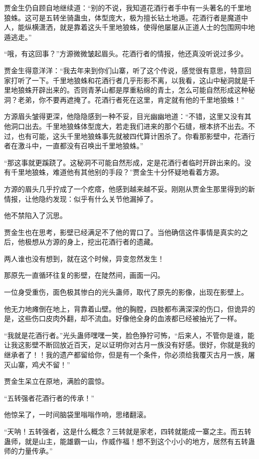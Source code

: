 \begin{this_body}
贾金生仍自顾自地继续道：“别的不说，我知道花酒行者手中有一头著名的千里地狼蛛。这可是五转坐骑蛊虫，体型庞大，极为擅长钻土地遁。花酒行者是魔道中人，能纵横潇洒，就是靠着这头千里地狼蛛，使得他屡屡从正道人士的包围网中地遁逃走。”

“哦，有这回事？”方源微微皱起眉头。花酒行者的情报，他还真没听说过多少。

贾金生得意洋洋：“我去年来到你们山寨，听了这个传说，感觉很有意思，特意回家打听了一下。千里地狼蛛和花酒行者几乎形影不离，以我看，这山中秘洞就是千里地狼蛛开辟出来的。否则青茅山都是厚重粘绵的青土，怎么可能自然形成这种秘洞？老弟，你不要再遮掩了。花酒行者死在这里，肯定就有他的千里地狼蛛！”

方源眉头皱得更深，他隐隐感到一种不妥，目光幽幽地道：“不错，这里又没有其他洞口出去。千里地狼蛛体型庞大，若走我们进来的那个石缝，根本挤不出去。不过，也有可能，这头千里地狼蛛事先就被四代算计困杀了。你看那影壁中，花酒行者在激斗中，一直都没有召唤出千里地狼蛛。”

“那这事就更蹊跷了。这秘洞不可能自然形成，定是花酒行者临时开辟出来的。没有千里地狼蛛，难道他有其他别的手段？”贾金生十分怀疑地看着方源。

方源的眉头几乎拧成了一个疙瘩，他感到越来越不妥。刚刚从贾金生那里得到的新情报，让他隐约发现：似乎有什么关节他漏掉了。

他不禁陷入了沉思。

贾金生也在思考，影壁已经满足不了他的胃口了。当他确信这件事情是真实的之后，他极想从方源的身上，挖出花酒行者的遗藏。

两人谁也没有想到，就在这个时候，异变忽然发生！

那原先一直循环往复的影壁，在陡然间，画面一闪。

一位身受重伤，面色极其惨白的光头蛊师，取代了原先的影像，出现在影壁上。

他无力地瘫倒在地上，背靠着山壁。他的胸膛，四肢都布满深深的伤口，但诡异的是，这些伤口皮肉外翻，却不流血。好像他全身的血液都已经被抽光了一样。

“我就是花酒行者。”光头蛊师嘿嘿一笑，脸色狰狞可怖，“后来人，不管你是谁，能让我这影壁不断回放近百天，足以证明你对古月一族没有好感。很好，你就是我的继承者了！！我的遗产都留给你，但是有一个条件，你必须给我覆灭古月一族，屠灭山寨，鸡犬不留！”

贾金生呆立在原地，满脸的震惊。

“五转强者花酒行者的传承！”

他惊呆了，一时间脑袋里嗡嗡作响，思绪翻滚。

“天呐！五转强者，这是什么概念？三转就是家老，四转就能成一寨之主。而五转蛊师，就是山主，能雄霸一山，作威作福！想不到这个小小的地方，居然有五转蛊师的力量传承。”


\end{this_body}
